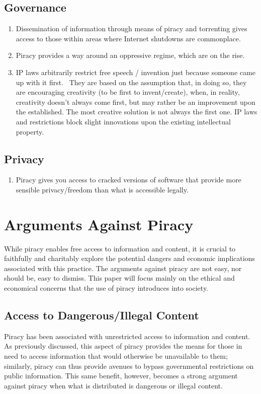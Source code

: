 \documentclass[onecolumn, 12pt]{article}
\begin{document}
\subsection{Governance}

\begin{enumerate}
  \item Dissemination of information through means of piracy and torrenting
    gives access to those within areas where Internet shutdowns are commonplace.

  \item Piracy provides a way around an oppressive regime, which are on the
    rise.~\cite{current:jigsaw}

  \item IP laws arbitrarily restrict free speech / invention just because
    someone came up with it first.~\cite[1339]{lemley:faith-based} They are
    based on the assumption that, in doing so, they are encouraging creativity
    (to be first to invent/create), when, in reality, creativity doesn't always
    come first, but may rather be an improvement upon the established. The most
    creative solution is not always the first one. IP laws and restrictions
    block slight innovations upon the existing intellectual property.
\end{enumerate}

\subsection{Privacy}

\begin{enumerate}
  \item Piracy gives you access to cracked versions of software that provide
    more sensible privacy/freedom than what is accessible
    legally.~\cite{stallman:right-to-read}
\end{enumerate}

\section{Arguments Against Piracy}
While piracy enables free access to information and content, it is crucial to
faithfully and charitably explore the potential dangers and economic
implications associated with this practice. The arguments against piracy are
not easy, nor should be, easy to dismiss. This paper will focus mainly on the
ethical and economical concerns that the use of piracy introduces into society.

\subsection{Access to Dangerous/Illegal Content}
Piracy has been associated with unrestricted access to information and
content. As previously discussed, this aspect of piracy provides the means for
those in need to access information that would otherwise be unavailable to them;
similarly, piracy can thus provide avenues to bypass governmental restrictions
on public information. This same benefit, however, becomes a strong argument
against piracy when what is distributed is dangerous or illegal content.
\end{document}
